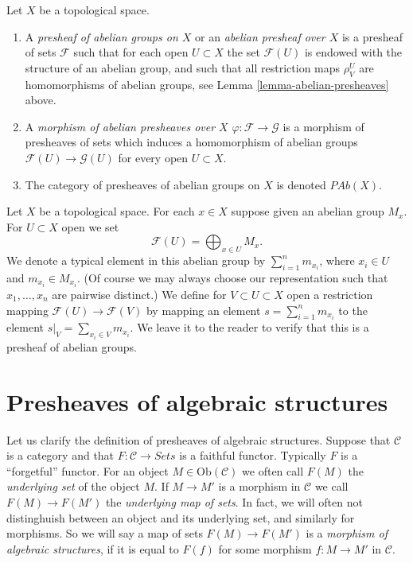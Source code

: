 \begin{definition}
\label{definition-abelian-presheaves}
Let $X$ be a topological space.
\begin{enumerate}
\item A {\it presheaf of abelian groups on $X$} or an
{\it abelian presheaf over $X$}
is a presheaf of sets $\mathcal{F}$ such that for each open
$U \subset X$ the set $\mathcal{F}(U)$ is endowed with
the structure of an abelian group, and such that all restriction
maps $\rho^U_V$ are homomorphisms of abelian groups, see
Lemma \ref{lemma-abelian-presheaves} above.
\item A {\it morphism of abelian presheaves over $X$}
$\varphi : \mathcal{F} \to \mathcal{G}$ is a morphism of presheaves
of sets which induces
a homomorphism of abelian groups $\mathcal{F}(U) \to \mathcal{G}(U)$
for every open $U \subset X$.
\item The category of presheaves of abelian groups on $X$ is denoted
$\textit{PAb}(X)$.
\end{enumerate}
\end{definition}

\begin{example}
\label{example-direct-sum-points}
Let $X$ be a topological space. For each $x \in X$ suppose
given an abelian group $M_x$. For $U \subset X$ open
we set
$$
\mathcal{F}(U) = \bigoplus\nolimits_{x \in U} M_x.
$$
We denote a typical element in this abelian group by
$\sum_{i=1}^n m_{x_i}$, where $x_i \in U$ and $m_{x_i} \in M_{x_i}$.
(Of course we may always choose our representation such that
$x_1,\ldots,x_n$ are pairwise distinct.)
We define for $V \subset U \subset X$ open a restriction
mapping $\mathcal{F}(U) \to \mathcal{F}(V)$ by
mapping an element $s = \sum_{i=1}^n m_{x_i}$ 
to the element $s|_V = \sum_{x_i \in V} m_{x_i}$.
We leave it to the reader to verify that this is a 
presheaf of abelian groups.
\end{example}



\section{Presheaves of algebraic structures}
\label{section-presheaves-structures}

\noindent
Let us clarify the definition
of presheaves of algebraic structures.
Suppose that $\mathcal{C}$ is a category and
that $F : \mathcal{C} \to \textit{Sets}$ is
a faithful functor. Typically $F$ is a ``forgetful''
functor. For an object $M \in \text{Ob}(\mathcal{C})$
we often call $F(M)$ the {\it underlying set} of the
object $M$. If $M \to M'$ is a morphism in $\mathcal{C}$
we call $F(M) \to F(M')$ the {\it underlying map of sets}.
In fact, we will often not distinghuish between an object
and its underlying set, and similarly for morphisms.
So we will say a map of sets $F(M) \to F(M')$
is a {\it morphism of algebraic structures}, if it is
equal to $F(f)$ for some morphism $f : M \to M'$
in $\mathcal{C}$.

